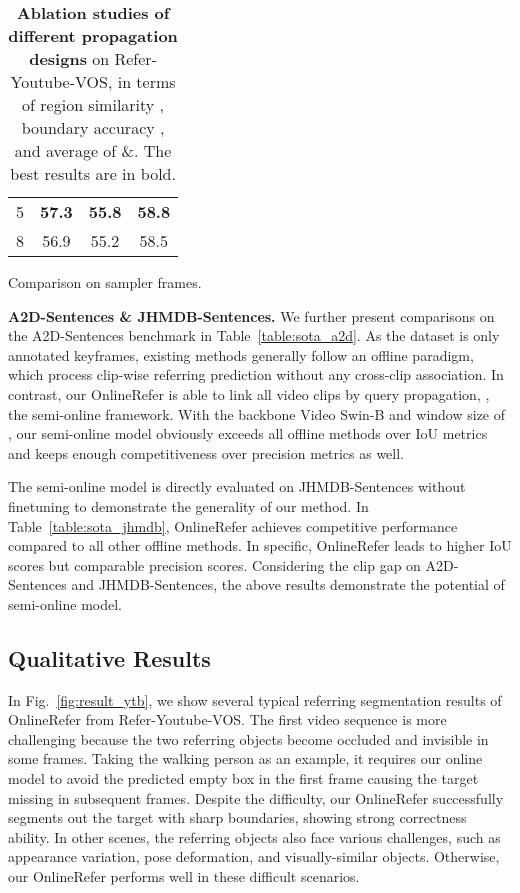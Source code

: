 \documentclass[10pt,twocolumn,letterpaper]{article}
\begin{document}
\begin{table*}[t!]
\begin{center}
\begin{subtable}[t]{0.3\linewidth}
\begin{tabular}{c|ccc}
        5 & \textbf{57.3} & \textbf{55.8} & \textbf{58.8} \\
        8 & 56.9 & 55.2 & 58.5 \\
        \hline
        \end{tabular}
        \vspace{-0.5mm}
        \caption{Comparison on sampler frames. }
        \label{table:3c}
    \end{subtable}
\end{center}
\vspace{-18pt}
  \caption{
    \textbf{Ablation studies of different propagation designs} on Refer-Youtube-VOS, in terms of region similarity , boundary accuracy , and average of \&. The best results are in bold.
    }
    \vspace{-4mm}
\end{table*}

\noindent\textbf{A2D-Sentences \& JHMDB-Sentences.}
We further present comparisons on the A2D-Sentences benchmark in Table~\ref{table:sota_a2d}.
As the dataset is only annotated keyframes, existing methods generally follow an offline paradigm, which process clip-wise referring prediction without any cross-clip association.
In contrast, our OnlineRefer is able to link all video clips by query propagation, \ie, the semi-online framework.
With the backbone Video Swin-B and window size of , our semi-online model obviously exceeds all offline methods over IoU metrics and keeps enough competitiveness over precision metrics as well.


The semi-online model is directly evaluated on JHMDB-Sentences without finetuning to  demonstrate the generality of our method. In Table~\ref{table:sota_jhmdb}, OnlineRefer achieves competitive performance compared to all other offline methods.
In specific, OnlineRefer leads to higher IoU scores but comparable precision scores.
Considering the clip gap on A2D-Sentences and JHMDB-Sentences, the above results demonstrate the potential of semi-online model.










\subsection{Qualitative Results}

In Fig.~\ref{fig:result_ytb}, we show several typical referring segmentation results of OnlineRefer from Refer-Youtube-VOS.
The first video sequence is more challenging because the two referring objects become occluded and invisible in some frames.
Taking the walking person as an example, it requires our online model to avoid the predicted empty box in the first frame causing the target missing in subsequent frames.
Despite the difficulty, our OnlineRefer successfully segments out the target with sharp boundaries, showing strong correctness ability.
In other scenes, the referring objects also face various challenges, such as appearance variation, pose deformation, and visually-similar objects.
Otherwise, our OnlineRefer performs well in these difficult scenarios.
\end{document}
